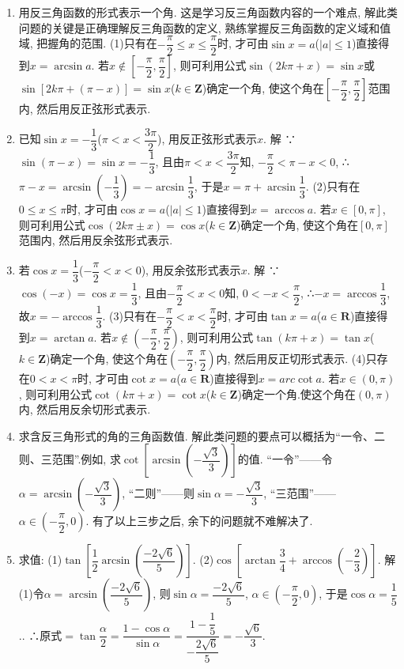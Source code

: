 \documentclass[10pt,a4paper]{article}
\begin{document}
\begin{enumerate}[1.]

\item 用反三角函数的形式表示一个角.
这是学习反三角函数内容的一个难点, 解此类问题的关键是正确理解反三角函数的定义, 熟练掌握反三角函数的定义域和值域, 把握角的范围.
(1)只有在$-\dfrac{\pi }2\le x\le \dfrac{\pi }2$时, 才可由$\sin x=a$($|a|\le 1$)直接得到$x=\arcsin a$.
若$x\notin [-\dfrac{\pi }2,\dfrac{\pi }2]$, 则可利用公式$\sin (2k\pi +x)=\sin x$或$\sin [2k\pi +(\pi -x)]=\sin x$($k\in \mathbf{Z}$)确定一个角, 使这个角在$[-\dfrac{\pi }2,\dfrac{\pi }2]$范围内, 然后用反正弦形式表示.
\item 已知$\sin x=-\dfrac 13$($\pi <x<\dfrac{3\pi }2$), 用反正弦形式表示$x$.
解  ∵$\sin (\pi -x)=\sin x=-\dfrac 13$, 且由$\pi <x<\dfrac{3\pi }2$知, $-\dfrac{\pi }2<\pi -x<0$,
∴$\pi -x=\arcsin (-\dfrac 13)=-\arcsin \dfrac 13$, 于是$x=\pi +\arcsin \dfrac 13$.
(2)只有在$0\le x\le \pi$时, 才可由$\cos x=a$($|a|\le 1$)直接得到$x=\arccos a$.
若$x\in [0,\pi]$, 则可利用公式$\cos (2k\pi \pm x)=\cos x$($k\in \mathbf{Z}$)确定一个角, 使这个角在$[0,\pi]$范围内, 然后用反余弦形式表示.
\item 若$\cos x=\dfrac 13$($-\dfrac{\pi }2<x<0$), 用反余弦形式表示$x$.
解  ∵$\cos (-x)=\cos x=\dfrac 13$, 且由$-\dfrac{\pi }2<x<0$知, $0<-x<\dfrac{\pi }2$,
∴$-x=\arccos \dfrac 13$, 故$x=-\arccos \dfrac 13$.
(3)只有在$-\dfrac{\pi }2<x<\dfrac{\pi }2$时, 才可由$\tan x=a$($a\in \mathbf{R}$)直接得到$x=\arctan a$.
若$x\notin (-\dfrac{\pi }2,\dfrac{\pi }2)$, 则可利用公式$\tan (k\pi +x)=\tan x$($k\in \mathbf{Z}$)确定一个角, 使这个角在$(-\dfrac{\pi }2,\dfrac{\pi }2)$内, 然后用反正切形式表示.
(4)只存在$0<x<\pi$时, 才可由$\cot x=a$($a\in \mathbf{R}$)直接得到$x=arc\cot a$.
若$x\in (0,\pi)$, 则可利用公式$\cot (k\pi +x)=\cot x$($k\in \mathbf{Z}$)确定一个角.使这个角在$(0,\pi)$内, 然后用反余切形式表示.
\item 求含反三角形式的角的三角函数值.
解此类问题的要点可以概括为``一令、二则、三范围''.例如, 求$\cot [\arcsin (-\dfrac{\sqrt 3}3)]$的值.
``一令''——令$\alpha =\arcsin (-\dfrac{\sqrt 3}3)$, ``二则''——则$\sin \alpha =-\dfrac{\sqrt 3}3$, ``三范围''——$\alpha \in (-\dfrac{\pi }2,0)$.
有了以上三步之后, 余下的问题就不难解决了.
\item 求值:
(1)$\tan [\dfrac 12\arcsin (\dfrac{-2\sqrt 6}5)]$.			(2)$\cos [\arctan \dfrac 34+\arccos (-\dfrac 23)]$.
解  (1)令$\alpha =\arcsin (\dfrac{-2\sqrt 6}5)$, 则$\sin \alpha =\dfrac{-2\sqrt 6}5$, $\alpha \in (-\dfrac{\pi }2,0)$, 于是$\cos \alpha =\dfrac 15$..
∴原式$=\tan \dfrac\alpha 2=\dfrac{1-\cos \alpha }{\sin \alpha }=\dfrac{1-\dfrac 15}{-\dfrac {2\sqrt 6}5}=-\dfrac{\sqrt 6}3$.

\end{enumerate}
\end{document}
